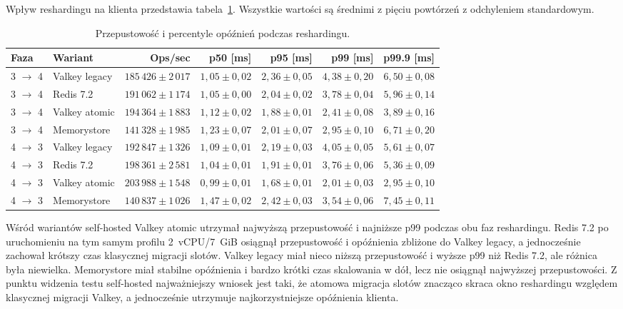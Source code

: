 Wpływ reshardingu na klienta przedstawia tabela~\ref{tab:reshard-latency-throughput}. Wszystkie wartości są średnimi z pięciu powtórzeń z odchyleniem standardowym.

\begin{table}[htbp]
\centering
\caption{Przepustowość i percentyle opóźnień podczas reshardingu.}
\label{tab:reshard-latency-throughput}
\begin{adjustbox}{max width=\textwidth}
\begin{tabular}{llrrrrr}
\toprule
Faza & Wariant & Ops/sec & p50 [ms] & p95 [ms] & p99 [ms] & p99.9 [ms] \\
\midrule
3 $\rightarrow$ 4 & Valkey legacy & $185\,426 \pm 2\,017$ & $1{,}05 \pm 0{,}02$ & $2{,}36 \pm 0{,}05$ & $4{,}38 \pm 0{,}20$ & $6{,}50 \pm 0{,}08$ \\
3 $\rightarrow$ 4 & Redis 7.2 & $191\,062 \pm 1\,174$ & $1{,}05 \pm 0{,}00$ & $2{,}04 \pm 0{,}02$ & $3{,}78 \pm 0{,}04$ & $5{,}96 \pm 0{,}14$ \\
3 $\rightarrow$ 4 & Valkey atomic & $194\,364 \pm 1\,883$ & $1{,}12 \pm 0{,}02$ & $1{,}88 \pm 0{,}01$ & $2{,}41 \pm 0{,}08$ & $3{,}89 \pm 0{,}16$ \\
3 $\rightarrow$ 4 & Memorystore & $141\,328 \pm 1\,985$ & $1{,}23 \pm 0{,}07$ & $2{,}01 \pm 0{,}07$ & $2{,}95 \pm 0{,}10$ & $6{,}71 \pm 0{,}20$ \\
4 $\rightarrow$ 3 & Valkey legacy & $192\,847 \pm 1\,326$ & $1{,}09 \pm 0{,}01$ & $2{,}19 \pm 0{,}03$ & $4{,}05 \pm 0{,}05$ & $5{,}61 \pm 0{,}07$ \\
4 $\rightarrow$ 3 & Redis 7.2 & $198\,361 \pm 2\,581$ & $1{,}04 \pm 0{,}01$ & $1{,}91 \pm 0{,}01$ & $3{,}76 \pm 0{,}06$ & $5{,}36 \pm 0{,}09$ \\
4 $\rightarrow$ 3 & Valkey atomic & $203\,988 \pm 1\,548$ & $0{,}99 \pm 0{,}01$ & $1{,}68 \pm 0{,}01$ & $2{,}01 \pm 0{,}03$ & $2{,}95 \pm 0{,}10$ \\
4 $\rightarrow$ 3 & Memorystore & $140\,837 \pm 1\,026$ & $1{,}47 \pm 0{,}02$ & $2{,}42 \pm 0{,}03$ & $3{,}54 \pm 0{,}06$ & $7{,}45 \pm 0{,}11$ \\
\bottomrule
\end{tabular}
\end{adjustbox}
\end{table}

\FloatBarrier

Wśród wariantów self-hosted Valkey atomic utrzymał najwyższą przepustowość i najniższe p99 podczas obu faz reshardingu. Redis 7.2 po uruchomieniu na tym samym profilu 2~vCPU/7~GiB osiągnął przepustowość i opóźnienia zbliżone do Valkey legacy, a jednocześnie zachował krótszy czas klasycznej migracji slotów. Valkey legacy miał nieco niższą przepustowość i wyższe p99 niż Redis 7.2, ale różnica była niewielka. Memorystore miał stabilne opóźnienia i bardzo krótki czas skalowania w dół, lecz nie osiągnął najwyższej przepustowości. Z punktu widzenia testu self-hosted najważniejszy wniosek jest taki, że atomowa migracja slotów znacząco skraca okno reshardingu względem klasycznej migracji Valkey, a jednocześnie utrzymuje najkorzystniejsze opóźnienia klienta.


